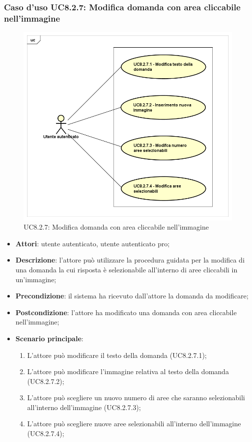 \subsubsection{Caso d'uso UC8.2.7: Modifica domanda con area cliccabile nell'immagine}
\label{UC8.2.7}
\begin{figure}[ht]
	\centering
	\includegraphics[scale=0.5,keepaspectratio]{UML/UC8_2_7.png}
	\caption{UC8.2.7: Modifica domanda con area cliccabile nell'immagine}
\end{figure}
\FloatBarrier
\begin{itemize}
	\item \textbf{Attori}: utente autenticato, utente autenticato pro;
	\item \textbf{Descrizione}: l'attore può utilizzare la procedura guidata per la modifica di una domanda la cui risposta è selezionabile all'interno di aree cliccabili in un'immagine;
	\item \textbf{Precondizione}:  il sistema ha ricevuto dall'attore la domanda da modificare; 
	\item \textbf{Postcondizione}: l'attore ha modificato una domanda con area cliccabile nell'immagine;
	\item \textbf{Scenario principale}:
		\begin{enumerate}
	       	\item L'attore può modificare il testo della domanda (UC8.2.7.1);
	        \item L'attore può modificare l'immagine relativa al testo della domanda (UC8.2.7.2);
			\item L'attore può scegliere un nuovo numero di aree che saranno selezionabili all'interno dell'immagine (UC8.2.7.3);
			\item L'attore può scegliere nuove aree selezionabili all'interno dell'immagine (UC8.2.7.4);
	 	\end{enumerate}
\end{itemize}

